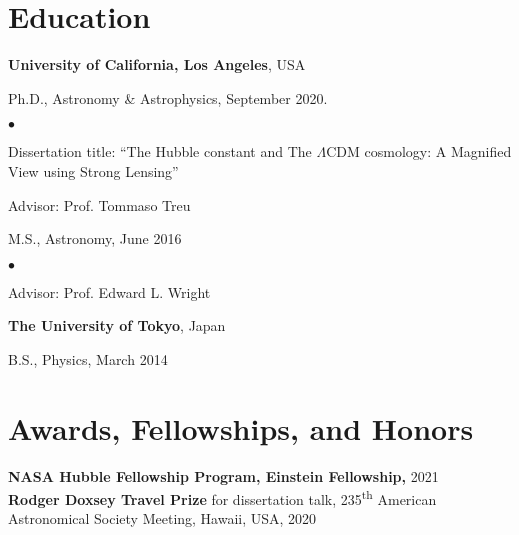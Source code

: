 \documentclass[margin, line]{res}
\newenvironment{list1}{
  \begin{list}{\ding{113}}{%
      \setlength{\itemsep}{0in}
      \setlength{\parsep}{0in} \setlength{\parskip}{0in}
      \setlength{\topsep}{0in} \setlength{\partopsep}{0in} 
      \setlength{\leftmargin}{0.17in}}}{\end{list}}
\newenvironment{list2}{
  \begin{list}{$\bullet$}{%
      \setlength{\itemsep}{0in}
      \setlength{\parsep}{0in} \setlength{\parskip}{0in}
      \setlength{\topsep}{0in} \setlength{\partopsep}{0in} 
      \setlength{\leftmargin}{0.2in}}}{\end{list}}
\begin{document}
\begin{resume}
\section{\sc Education}
{\bf University of California, Los Angeles}, USA\\
\vspace*{-.1in}
\begin{list1}
	\item[] Ph.D., Astronomy \& Astrophysics, September 2020.
	\begin{list2}
		\vspace*{.05in}
		\item Dissertation title:  ``The Hubble constant and The $\Lambda$CDM cosmology: A Magnified View using Strong Lensing'' 
		\item Advisor:  Prof. Tommaso Treu
	\end{list2}
\end{list1}
\vspace*{.05in}

\begin{list1}
	\item[] M.S., Astronomy,  June 2016
	\begin{list2}
		\vspace*{.05in} 
		\item Advisor:  Prof. Edward L. Wright
	\end{list2}
\end{list1}

{\bf The University of Tokyo}, Japan\\
\vspace*{-.1in}
\begin{list1}
\item[] B.S., Physics,  March 2014
\end{list1}



\section{\sc Awards, Fellowships, and Honors}
\textbf{NASA Hubble Fellowship Program, Einstein Fellowship,} 2021 \\
\textbf{Rodger Doxsey Travel Prize} for dissertation talk, 235\textsuperscript{th} American Astronomical Society Meeting, Hawaii, USA, 2020 


\end{resume}
\end{document}
